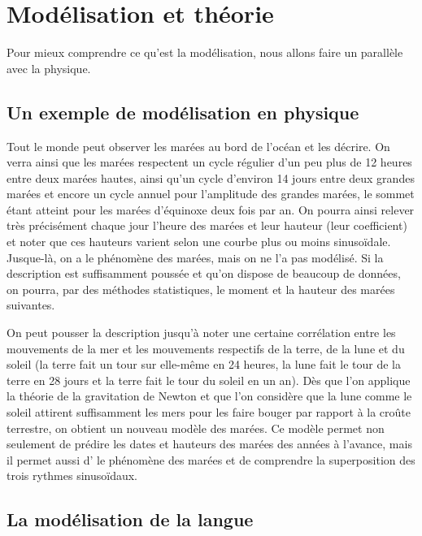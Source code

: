 \section{Modélisation et théorie}\label{sec:1.3.2}

Pour mieux comprendre ce qu’est la modélisation, nous allons faire un parallèle avec la physique.

\subsection{Un exemple de modélisation en physique}

Tout le monde peut observer les marées au bord de l’océan et les décrire. On verra ainsi que les marées respectent un cycle régulier d’un peu plus de 12 heures entre deux marées hautes, ainsi qu’un cycle d’environ 14 jours entre deux grandes marées et encore un cycle annuel pour l’amplitude des grandes marées, le sommet étant atteint pour les marées d’équinoxe deux fois par an. On pourra ainsi relever très précisément chaque jour l’heure des marées et leur hauteur (leur coefficient) et noter que ces hauteurs varient selon une courbe plus ou moins sinusoïdale. Jusque-là, on a  le phénomène des marées, mais on ne l’a pas modélisé. Si la description est suffisamment poussée et qu’on dispose de beaucoup de données, on pourra, par des méthodes statistiques,  le moment et la hauteur des marées suivantes.

On peut pousser la description jusqu’à noter une certaine corrélation entre les mouvements de la mer et les mouvements respectifs de la terre, de la lune et du soleil (la terre fait un tour sur elle-même en 24 heures, la lune fait le tour de la terre en 28 jours et la terre fait le tour du soleil en un an). Dès que l’on applique la théorie de la gravitation de Newton et que l’on considère que la lune comme le soleil attirent suffisamment les mers pour les faire bouger par rapport à la croûte terrestre, on obtient un nouveau modèle des marées. Ce modèle permet non seulement de prédire les dates et hauteurs des marées des années à l’avance, mais il permet aussi d’ le phénomène des marées et de comprendre la superposition des trois rythmes sinusoïdaux.

\subsection{La modélisation de la langue}

